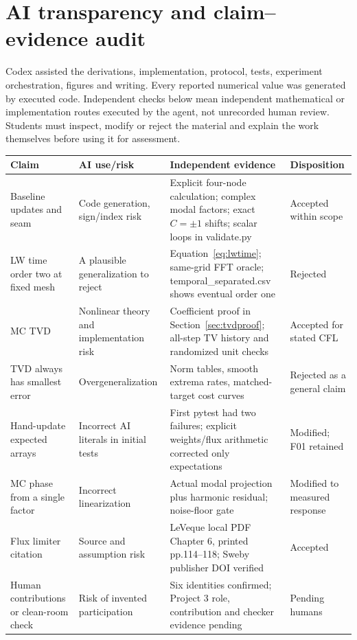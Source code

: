 \appendix
\section{AI transparency and claim--evidence audit}
Codex assisted the derivations, implementation, protocol, tests, experiment orchestration, figures and writing. Every reported numerical value was generated by executed code. Independent checks below mean independent mathematical or implementation routes executed by the agent, not unrecorded human review. Students must inspect, modify or reject the material and explain the work themselves before using it for assessment.
\begingroup\small\sloppy\setlength{\tabcolsep}{4pt}\begin{longtable}{p{.17\linewidth}p{.21\linewidth}p{.38\linewidth}p{.13\linewidth}}
\toprule Claim & AI use/risk & Independent evidence & Disposition\\\midrule\endhead
Baseline updates and seam & Code generation, sign/index risk & Explicit four-node calculation; complex modal factors; exact $C=\pm1$ shifts; scalar loops in validate.py & Accepted within scope\\
LW time order two at fixed mesh & A plausible generalization to reject & Equation~\eqref{eq:lwtime}; same-grid FFT oracle; temporal\_separated.csv shows eventual order one & Rejected\\
MC TVD & Nonlinear theory and implementation risk & Coefficient proof in Section~\ref{sec:tvdproof}; all-step TV history and randomized unit checks & Accepted for stated CFL\\
TVD always has smallest error & Overgeneralization & Norm tables, smooth extrema rates, matched-target cost curves & Rejected as a general claim\\
Hand-update expected arrays & Incorrect AI literals in initial tests & First pytest had two failures; explicit weights/flux arithmetic corrected only expectations & Modified; F01 retained\\
MC phase from a single factor & Incorrect linearization & Actual modal projection plus harmonic residual; noise-floor gate & Modified to measured response\\
Flux limiter citation & Source and assumption risk & LeVeque local PDF Chapter 6, printed pp.114--118; Sweby publisher DOI verified & Accepted\\
Human contributions or clean-room check & Risk of invented participation & Six identities confirmed; Project 3 role, contribution and checker evidence pending & Pending humans\\
\bottomrule
\end{longtable}\endgroup
\clearpage
